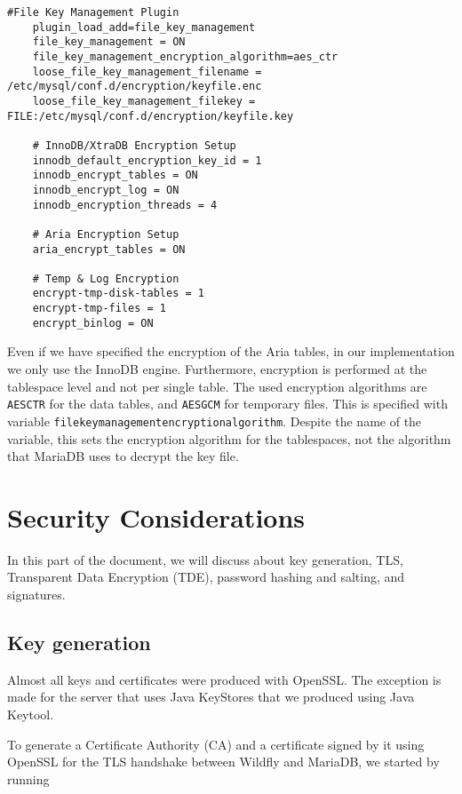 \begin{lstlisting}[style=XMLStyle]
    #File Key Management Plugin
    plugin_load_add=file_key_management
    file_key_management = ON
    file_key_management_encryption_algorithm=aes_ctr
    loose_file_key_management_filename = /etc/mysql/conf.d/encryption/keyfile.enc
    loose_file_key_management_filekey = FILE:/etc/mysql/conf.d/encryption/keyfile.key

    # InnoDB/XtraDB Encryption Setup
    innodb_default_encryption_key_id = 1
    innodb_encrypt_tables = ON
    innodb_encrypt_log = ON
    innodb_encryption_threads = 4

    # Aria Encryption Setup
    aria_encrypt_tables = ON

    # Temp & Log Encryption
    encrypt-tmp-disk-tables = 1
    encrypt-tmp-files = 1
    encrypt_binlog = ON
\end{lstlisting}

Even if we have specified the encryption of the Aria tables, in our implementation we only use the InnoDB engine. Furthermore, encryption is performed at the tablespace level and not per single table. The used encryption algorithms are \texttt{AES\textunderscore CTR} for the data tables, and \texttt{AES\textunderscore GCM} for temporary files. This is specified with variable \texttt{file\textunderscore key\textunderscore management\textunderscore encryption\textunderscore algorithm}. Despite the name of the variable, this sets the encryption algorithm for the tablespaces, not the algorithm that MariaDB uses to decrypt the key file\cite{online:FileKeyManMariaDB}.

\newpage
\chapter{Security Considerations}
\label{chap:secCons}

In this part of the document, we will discuss about key generation, TLS, Transparent Data Encryption (TDE), password hashing and salting, and signatures.

\section{Key generation}

Almost all keys and certificates were produced with OpenSSL. The exception is made for the server that uses Java KeyStores that we produced using Java Keytool.

To generate a Certificate Authority (CA) and a certificate signed by it using OpenSSL for the TLS handshake between Wildfly and MariaDB, we started by running\\

